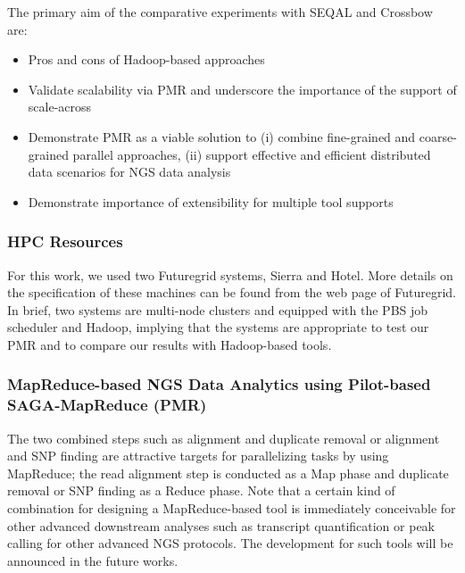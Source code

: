 \documentclass{acm_proc_article-sp}
\begin{document}
The primary aim of the comparative experiments with SEQAL and Crossbow
are:

\begin{itemize}
\item Pros and cons of Hadoop-based approaches
\item Validate scalability via PMR and underscore the importance of the
  support of scale-across
\item Demonstrate PMR as a viable solution to (i) combine fine-grained
  and coarse-grained parallel approaches, (ii) support effective and
  efficient distributed data scenarios for NGS data analysis
\item Demonstrate importance of extensibility for multiple tool
  supports
\end{itemize}

\subsubsection{HPC Resources}
For this work, we used two Futuregrid systems, Sierra and Hotel.  More details on the specification of these machines can be found from the web page of Futuregrid\cite{futuregrid_url}.  In brief, two systems are multi-node clusters and equipped with the PBS job scheduler and Hadoop, implying that the systems are appropriate to test our PMR and to compare our results with Hadoop-based tools.

\subsubsection{MapReduce-based NGS Data Analytics using Pilot-based SAGA-MapReduce (PMR)}
The two combined steps such as alignment and duplicate removal or alignment and SNP finding are attractive targets for  parallelizing tasks by using MapReduce; the read alignment step is conducted as a Map phase and duplicate removal or SNP finding as a Reduce phase.  Note that a certain kind of combination for designing a MapReduce-based tool is immediately conceivable for other advanced downstream analyses such as transcript quantification or peak calling for other advanced NGS protocols.  The development for such tools will be announced in the future works.
\end{document}
